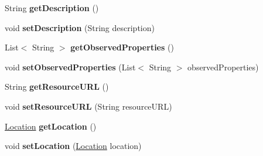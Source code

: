\begin{DoxyCompactItemize}
\item 
String {\bfseries get\+Description} ()\hypertarget{classeu_1_1h2020_1_1symbiote_1_1model_1_1Resource_ae2ce583e094c18bca236027602739049}{}\label{classeu_1_1h2020_1_1symbiote_1_1model_1_1Resource_ae2ce583e094c18bca236027602739049}

\item 
void {\bfseries set\+Description} (String description)\hypertarget{classeu_1_1h2020_1_1symbiote_1_1model_1_1Resource_a19349909b51f43be943fcc3ebc078009}{}\label{classeu_1_1h2020_1_1symbiote_1_1model_1_1Resource_a19349909b51f43be943fcc3ebc078009}

\item 
List$<$ String $>$ {\bfseries get\+Observed\+Properties} ()\hypertarget{classeu_1_1h2020_1_1symbiote_1_1model_1_1Resource_a2aaf59e1be5b0c974a31e106adfa6c43}{}\label{classeu_1_1h2020_1_1symbiote_1_1model_1_1Resource_a2aaf59e1be5b0c974a31e106adfa6c43}

\item 
void {\bfseries set\+Observed\+Properties} (List$<$ String $>$ observed\+Properties)\hypertarget{classeu_1_1h2020_1_1symbiote_1_1model_1_1Resource_a826dbee60cf539ffbf1a088496ac7e11}{}\label{classeu_1_1h2020_1_1symbiote_1_1model_1_1Resource_a826dbee60cf539ffbf1a088496ac7e11}

\item 
String {\bfseries get\+Resource\+U\+RL} ()\hypertarget{classeu_1_1h2020_1_1symbiote_1_1model_1_1Resource_a4a0c05d9007f2216c55ddc32a44f467b}{}\label{classeu_1_1h2020_1_1symbiote_1_1model_1_1Resource_a4a0c05d9007f2216c55ddc32a44f467b}

\item 
void {\bfseries set\+Resource\+U\+RL} (String resource\+U\+RL)\hypertarget{classeu_1_1h2020_1_1symbiote_1_1model_1_1Resource_a27d7401a8087bf902fd575039d574d0c}{}\label{classeu_1_1h2020_1_1symbiote_1_1model_1_1Resource_a27d7401a8087bf902fd575039d574d0c}

\item 
\hyperlink{classeu_1_1h2020_1_1symbiote_1_1model_1_1Location}{Location} {\bfseries get\+Location} ()\hypertarget{classeu_1_1h2020_1_1symbiote_1_1model_1_1Resource_acfb7ead093f1ed692640c99daba8fc6c}{}\label{classeu_1_1h2020_1_1symbiote_1_1model_1_1Resource_acfb7ead093f1ed692640c99daba8fc6c}

\item 
void {\bfseries set\+Location} (\hyperlink{classeu_1_1h2020_1_1symbiote_1_1model_1_1Location}{Location} location)\hypertarget{classeu_1_1h2020_1_1symbiote_1_1model_1_1Resource_a14eba3bd0171783f32d6d4446768905d}{}\label{classeu_1_1h2020_1_1symbiote_1_1model_1_1Resource_a14eba3bd0171783f32d6d4446768905d}


\end{DoxyCompactItemize}
